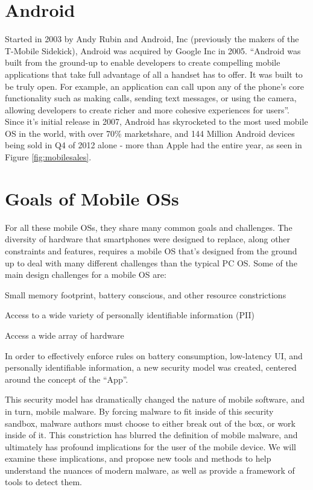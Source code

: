 \section{Android}
Started in 2003 by Andy Rubin and Android, Inc (previously the makers of the T-Mobile Sidekick), Android was acquired by Google Inc in 2005\citep{businessweek2005}. ``Android was built from the ground-up to enable developers to create compelling mobile applications that take full advantage of all a handset has to offer. It was built to be truly open. For example, an application can call upon any of the phone’s core functionality such as making calls, sending text messages, or using the camera, allowing developers to create richer and more cohesive experiences for users''\citep{ohaandroidoverview}. Since it's initial release in 2007\citep{oharelease2007}, Android has skyrocketed to the most used mobile OS in the world, with over 70\% marketshare, and 144 Million Android devices being sold in Q4 of 2012 alone\citep{gartnerq42012} - more than Apple had the entire year, as seen in Figure \ref{fig:mobilesales}.



\section{Goals of Mobile OSs}
For all these mobile OSs, they share many common goals and challenges. The diversity of hardware that smartphones were designed to replace, along other constraints and features, requires a mobile OS that's designed from the ground up to deal with many different challenges than the typical PC OS. Some of the main design challenges for a mobile OS are: 
\begin{smitemize}

\item Small memory footprint, battery conscious, and other resource constrictions

\item Access to a wide variety of personally identifiable information (PII)

\item Access a wide array of hardware

\end{smitemize}
In order to effectively enforce rules on battery consumption, low-latency UI, and personally identifiable information, a new security model was created, centered around the concept of the ``App''. 

This security model has dramatically changed the nature of mobile software, and in turn, mobile malware. By forcing malware to fit inside of this security sandbox, malware authors must choose to either break out of the box, or work inside of it. This constriction has blurred the definition of mobile malware, and ultimately has profound implications for the user of the mobile device. We will examine these implications, and propose new tools and methods to help understand the nuances of modern malware, as well as provide a framework of tools to detect them.

